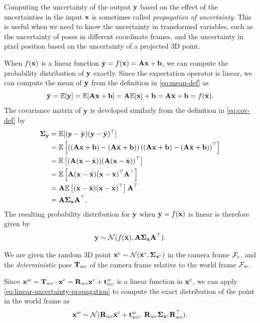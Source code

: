 Computing the uncertainty of the output $\vecy$ based on the effect of the uncertainties in the input $\vecx$ is sometimes called \emph{propagation of uncertainty}.
This is useful when we need to know the uncertainty in transformed variables, such as the uncertainty of poses in different coordinate frames, and the uncertainty in pixel position based on the uncertainty of a projected 3D point.

When $f(\vecx)$ is a linear function $\vecy = f(\vecx) = \matA\vecx + \vecb$, we can compute the probability distribution of $\vecy$ exactly.
Since the expectation operator is linear, we can compute the mean of $\vecy$ from the definition in \eqref{eq:mean-def} as
\begin{equation} \label{eq:linear-mean}
  \bar{\vecy} = \bbE[\vecy] = \bbE[\matA \vecx + \vecb] = \matA \bbE[\vecx] + \vecb = \matA \bar{\vecx} + \vecb = f(\bar{\vecx}).
\end{equation}
The covariance matrix of $\vecy$ is developed similarly from the definition in \eqref{eq:cov-def} by
\begin{subequations}\label{eq:linear-cov}
\begin{align}
  \matSigma_\vecy &= \bbE[(\vecy - \bar{\vecy}) (\vecy - \bar{\vecy})\trans]\\
  &= \bbE \left[  \left( (\matA \vecx + \vecb) - (\matA \bar{\vecx} + \vecb) \right) \left( (\matA \vecx + \vecb) - (\matA \bar{\vecx} + \vecb) \right)\trans \right]\\
  &= \bbE \left[ (\matA(\vecx - \bar{\vecx})) (\matA(\vecx - \bar{\vecx}))\trans \right]\\
  &= \bbE \left[ \matA(\vecx - \bar{\vecx}) (\vecx - \bar{\vecx})\trans \matA\trans \right]\\
  &= \matA \bbE\left[ (\vecx - \bar{\vecx}) (\vecx - \bar{\vecx})\trans \right] \matA\trans\\
  &= \matA \matSigma_\vecx \matA\trans.
\end{align}
\end{subequations}
The resulting probability distribution for $\vecy$ when $\vecy = f(\vecx)$ is linear is therefore given by
\begin{equation} \label{eq:linear-uncertainty-propagation}
  \vecy \sim \cN(f(\bar{\vecx}), \matA \matSigma_\vecx \matA\trans).
\end{equation}

\begin{example}[frametitle=Transforming random points with deterministic poses]
We are given the random 3D point $\vecx^c \sim \cN(\bar{\vecx}^c, \matSigma_{\vecx^c})$ in the camera frame $\cF_c$, and the \emph{deterministic} pose $\matT_{wc}$ of the camera frame relative to the world frame $\cF_w$.

Since $\vecx^w = \matT_{wc} \cdot \vecx^c = \matR_{wc}\vecx^c + \vect^w_{wc}$ is a linear function in $\vecx^c$, we can apply \eqref{eq:linear-uncertainty-propagation} to compute the exact distribution of the point in the world frame as
\begin{equation}
  \vecx^w \sim \cN(\matR_{wc}\bar{\vecx}^c + \vect^w_{wc}, \; \matR_{wc} \matSigma_{\vecx^c} \matR_{wc}\trans).
\end{equation}
\end{example}

